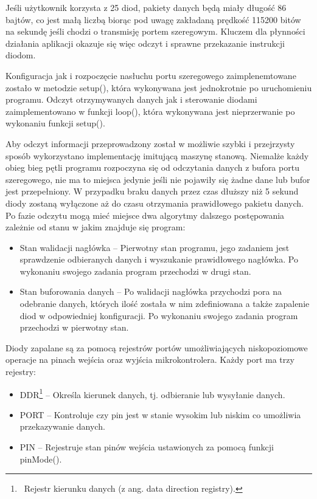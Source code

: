 \documentclass[12pt]{report}
\begin{document}
Jeśli użytkownik korzysta z 25 diod, pakiety danych będą miały długość 86 bajtów, co jest małą liczbą biorąc pod uwagę zakładaną prędkość 115200 bitów na sekundę jeśli chodzi o transmisję portem szeregowym. Kluczem dla płynności działania aplikacji okazuje się więc odczyt i sprawne przekazanie instrukcji diodom.

Konfiguracja jak i rozpoczęcie nasłuchu portu szeregowego zaimplenemtowane zostało w metodzie setup(), która wykonywana jest jednokrotnie po uruchomieniu programu. Odczyt otrzymywanych danych jak i sterowanie diodami zaimplementowano w funkcji loop(), która wykonywana jest nieprzerwanie po wykonaniu funkcji setup().

Aby odczyt informacji przeprowadzony został w możliwie szybki i przejrzysty sposób wykorzystano implementację imitującą maszynę stanową. Niemalże każdy obieg bieg pętli programu rozpoczyna się od odczytania danych z bufora portu szeregowego, nie ma to miejsca jedynie jeśli nie pojawiły się żadne dane lub bufor jest przepełniony. W przypadku braku danych przez czas dłuższy niż 5 sekund diody zostaną wyłączone aż do czasu otrzymania prawidłowego pakietu danych. Po fazie odczytu mogą mieć miejsce dwa algorytmy dalszego postępowania zależnie od stanu w jakim znajduje się program:

\begin{itemize}
	\item Stan walidacji nagłówka -- Pierwotny stan programu, jego zadaniem jest sprawdzenie odbieranych danych i wyszukanie prawidłowego nagłówka. Po wykonaniu swojego zadania program przechodzi w drugi stan.
	\item Stan buforowania danych -- Po walidacji nagłówka przychodzi pora na odebranie danych, których ilość została w nim zdefiniowana a także zapalenie diod w odpowiedniej konfiguracji. Po wykonaniu swojego zadania program przechodzi w pierwotny stan.
\end{itemize}

Diody zapalane są za pomocą rejestrów portów umożliwiających niskopoziomowe operacje na pinach wejścia oraz wyjścia mikrokontrolera. Każdy port ma trzy rejestry:

\begin{itemize}
	\item DDR\footnote{~Rejestr kierunku danych (z ang. data direction registry).} -- Określa kierunek danych, tj. odbieranie lub wysyłanie danych.
	\item PORT -- Kontroluje czy pin jest w stanie wysokim lub niskim co umożliwia przekazywanie danych.
	\item PIN -- Rejestruje stan pinów wejścia ustawionych za pomocą funkcji pinMode().
\end{itemize}
\end{document}
